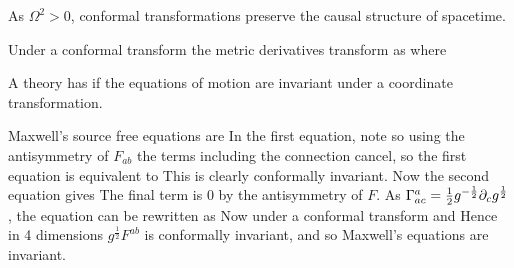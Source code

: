 \documentclass{article}
\begin{document}
\begin{fact}
As $\Omega^2 > 0$, conformal transformations preserve the causal structure of spacetime. 
\end{fact}

\begin{lemma}
Under a conformal transform the metric derivatives transform as 
where 
\end{lemma}

\begin{definition}
A theory has  if the equations of motion are invariant under a coordinate transformation.
\end{definition}

\begin{example}
Maxwell's source free equations are 
In the first equation, note 
so using the antisymmetry of $F_{ab}$ the terms including the connection cancel, so the first equation is equivalent to 
This is clearly conformally invariant. Now the second equation gives 
The final term is 0 by the antisymmetry of $F$. As $\Gamma^a_{ac} =\frac{1}{2} g^{-\frac{1}{2}} \partial_c g^\frac{1}{2}$, the equation can be rewritten as 
Now under a conformal transform 
and 
Hence in 4 dimensions $g^\frac{1}{2}F^{ab}$ is conformally invariant, and so Maxwell's equations are invariant. 
\end{example}
\end{document}
